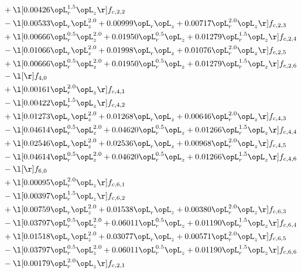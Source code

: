 \begin{alignat}{2}
& + \l[  0.00426 \opL_r^{1.5} \opL_z  \r] f_{c,2,2} \nonumber \\ 
& - \l[  0.00533 \opL_r \opL_z^{2.0} +  0.00999 \opL_r \opL_z +  0.00717 \opL_r^{2.0} \opL_z  \r] f_{c,2,3} \nonumber \\ 
& + \l[  0.00666 \opL_r^{0.5} \opL_z^{2.0} +  0.01950 \opL_r^{0.5} \opL_z +  0.01279 \opL_r^{1.5} \opL_z  \r] f_{c,2,4} \nonumber \\ 
& - \l[  0.01066 \opL_r \opL_z^{2.0} +  0.01998 \opL_r \opL_z +  0.01076 \opL_r^{2.0} \opL_z  \r] f_{c,2,5} \nonumber \\ 
& + \l[  0.00666 \opL_r^{0.5} \opL_z^{2.0} +  0.01950 \opL_r^{0.5} \opL_z +  0.01279 \opL_r^{1.5} \opL_z  \r] f_{c,2,6} \nonumber \\ 
& - \l[  \r] f_{4,0} \nonumber \\ 
& + \l[  0.00161 \opL_r^{2.0} \opL_z  \r] f_{c,4,1} \nonumber \\ 
& - \l[  0.00422 \opL_r^{1.5} \opL_z  \r] f_{c,4,2} \nonumber \\ 
& + \l[  0.01273 \opL_r \opL_z^{2.0} +  0.01268 \opL_r \opL_z +  0.00646 \opL_r^{2.0} \opL_z  \r] f_{c,4,3} \nonumber \\ 
& - \l[  0.04614 \opL_r^{0.5} \opL_z^{2.0} +  0.04620 \opL_r^{0.5} \opL_z +  0.01266 \opL_r^{1.5} \opL_z  \r] f_{c,4,4} \nonumber \\ 
& + \l[  0.02546 \opL_r \opL_z^{2.0} +  0.02536 \opL_r \opL_z +  0.00968 \opL_r^{2.0} \opL_z  \r] f_{c,4,5} \nonumber \\ 
& - \l[  0.04614 \opL_r^{0.5} \opL_z^{2.0} +  0.04620 \opL_r^{0.5} \opL_z +  0.01266 \opL_r^{1.5} \opL_z  \r] f_{c,4,6} \nonumber \\ 
& - \l[  \r] f_{6,0} \nonumber \\ 
& + \l[  0.00095 \opL_r^{2.0} \opL_z  \r] f_{c,6,1} \nonumber \\ 
& - \l[  0.00397 \opL_r^{1.5} \opL_z  \r] f_{c,6,2} \nonumber \\ 
& + \l[  0.00759 \opL_r \opL_z^{2.0} +  0.01538 \opL_r \opL_z +  0.00380 \opL_r^{2.0} \opL_z  \r] f_{c,6,3} \nonumber \\ 
& - \l[  0.03797 \opL_r^{0.5} \opL_z^{2.0} +  0.06011 \opL_r^{0.5} \opL_z +  0.01190 \opL_r^{1.5} \opL_z  \r] f_{c,6,4} \nonumber \\ 
& + \l[  0.01518 \opL_r \opL_z^{2.0} +  0.03077 \opL_r \opL_z +  0.00571 \opL_r^{2.0} \opL_z  \r] f_{c,6,5} \nonumber \\ 
& - \l[  0.03797 \opL_r^{0.5} \opL_z^{2.0} +  0.06011 \opL_r^{0.5} \opL_z +  0.01190 \opL_r^{1.5} \opL_z  \r] f_{c,6,6} \nonumber \\ 
& - \l[  0.00179 \opL_r^{2.0} \opL_z  \r] f_{c,2,1} \nonumber \\ 
\end{alignat} 


